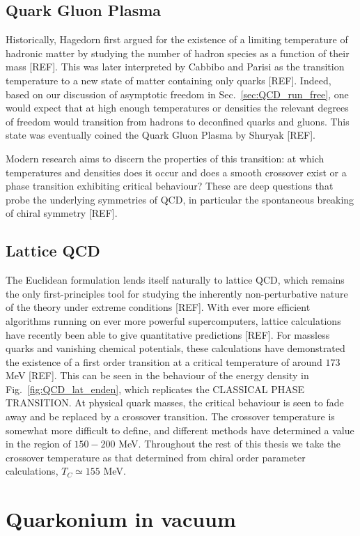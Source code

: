 \documentclass[12pt, a4paper, twoside]{book}
\begin{document}
\subsection{Quark Gluon Plasma}
\label{sec:QGP}
Historically, Hagedorn first argued for the existence of a limiting temperature of hadronic matter by studying the number of hadron species as a function of their mass [REF]. This was later interpreted by Cabbibo and Parisi as the transition temperature to a new state of matter containing only quarks [REF]. Indeed, based on our discussion of asymptotic freedom in Sec.~\ref{sec:QCD_run_free}, one would expect that at high enough temperatures or densities the relevant degrees of freedom would transition from hadrons to deconfined quarks and gluons. This state was eventually coined the Quark Gluon Plasma by Shuryak [REF]. 

Modern research aims to discern the properties of this transition: at which temperatures and densities does it occur and does a smooth crossover exist or a phase transition exhibiting critical behaviour? These are deep questions that probe the underlying symmetries of QCD, in particular the spontaneous breaking of chiral symmetry [REF]. 
\subsection{Lattice QCD}
The Euclidean formulation lends itself naturally to lattice QCD, which remains the only first-principles tool for studying the inherently non-perturbative nature of the theory under extreme conditions [REF]. With ever more efficient algorithms running on ever more powerful supercomputers, lattice calculations have recently been able to give quantitative predictions [REF]. For massless quarks and vanishing chemical potentials, these calculations have demonstrated the existence of a first order transition at a critical temperature of around \(173\) MeV [REF]. This can be seen in the behaviour of the energy density in Fig.~\ref{fig:QCD_lat_enden}, which replicates the CLASSICAL PHASE TRANSITION. At physical quark masses, the critical behaviour is seen to fade away and be replaced by a crossover transition. The crossover temperature is somewhat more difficult to define, and different methods have determined a value in the region of \(150-200\) MeV. Throughout the rest of this thesis we take the crossover temperature as that determined from chiral order parameter calculations, \(T_C\simeq155\) MeV.
\section{Quarkonium in vacuum}
\label{sec:quark_vac}
\onehalfspacing
\end{document}
